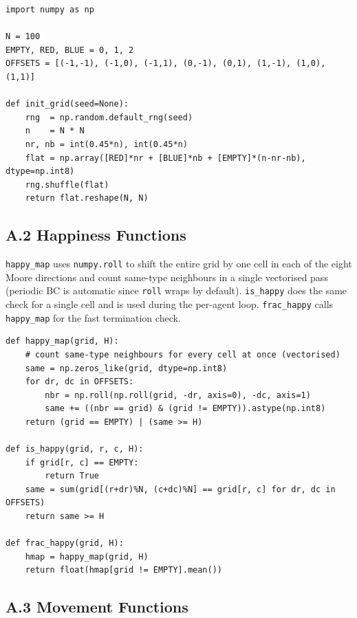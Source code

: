 \documentclass[11pt, a4paper]{article}
\begin{document}
\begin{lstlisting}
import numpy as np

N = 100
EMPTY, RED, BLUE = 0, 1, 2
OFFSETS = [(-1,-1), (-1,0), (-1,1), (0,-1), (0,1), (1,-1), (1,0), (1,1)]

def init_grid(seed=None):
    rng  = np.random.default_rng(seed)
    n    = N * N
    nr, nb = int(0.45*n), int(0.45*n)
    flat = np.array([RED]*nr + [BLUE]*nb + [EMPTY]*(n-nr-nb), dtype=np.int8)
    rng.shuffle(flat)
    return flat.reshape(N, N)
\end{lstlisting}

\subsection*{A.2 \quad Happiness Functions}

\texttt{happy\_map} uses \texttt{numpy.roll} to shift the entire grid by one cell in
each of the eight Moore directions and count same-type neighbours in a single vectorised
pass (periodic BC is automatic since \texttt{roll} wraps by default).
\texttt{is\_happy} does the same check for a single cell and is used during the
per-agent loop.
\texttt{frac\_happy} calls \texttt{happy\_map} for the fast termination check.

\begin{lstlisting}
def happy_map(grid, H):
    # count same-type neighbours for every cell at once (vectorised)
    same = np.zeros_like(grid, dtype=np.int8)
    for dr, dc in OFFSETS:
        nbr = np.roll(np.roll(grid, -dr, axis=0), -dc, axis=1)
        same += ((nbr == grid) & (grid != EMPTY)).astype(np.int8)
    return (grid == EMPTY) | (same >= H)

def is_happy(grid, r, c, H):
    if grid[r, c] == EMPTY:
        return True
    same = sum(grid[(r+dr)%N, (c+dc)%N] == grid[r, c] for dr, dc in OFFSETS)
    return same >= H

def frac_happy(grid, H):
    hmap = happy_map(grid, H)
    return float(hmap[grid != EMPTY].mean())
\end{lstlisting}

\subsection*{A.3 \quad Movement Functions}
\end{document}

